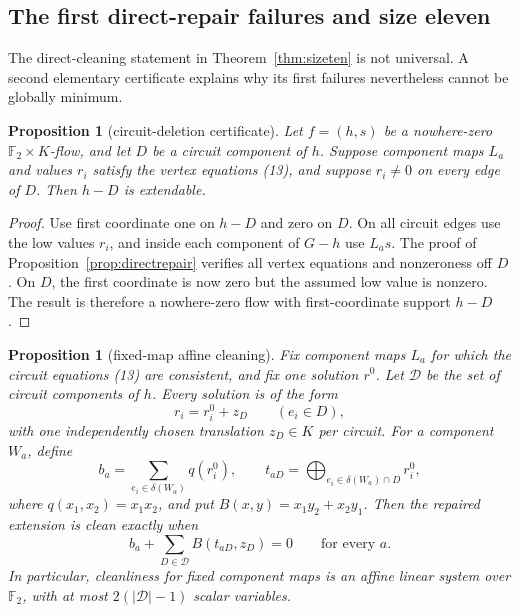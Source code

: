 \documentclass[11pt]{article}
\newtheorem{proposition}[theorem]{Proposition}
\theoremstyle{definition}
\theoremstyle{remark}
\newcommand{\F}{\mathbb F}
\begin{document}
\subsection{The first direct-repair failures and size eleven}

The direct-cleaning statement in Theorem~\ref{thm:sizeten} is not
universal.  A second elementary certificate explains why its first
failures nevertheless cannot be globally minimum.

\begin{proposition}[circuit-deletion certificate]
\label{prop:deletecircuit}
Let \(f=(h,s)\) be a nowhere-zero \(\F_2\times K\)-flow, and let \(D\) be
a circuit component of \(h\).  Suppose component maps \(L_a\) and values
\(r_i\) satisfy the vertex equations (13), and suppose \(r_i\ne0\) on
every edge of \(D\).  Then \(h-D\) is extendable.
\end{proposition}

\begin{proof}
Use first coordinate one on \(h-D\) and zero on \(D\).  On all circuit
edges use the low values \(r_i\), and inside each component of \(G-h\)
use \(L_as\).  The proof of Proposition~\ref{prop:directrepair} verifies
all vertex equations and nonzeroness off \(D\).  On \(D\), the first
coordinate is now zero but the assumed low value is nonzero.  The result
is therefore a nowhere-zero flow with first-coordinate support \(h-D\).
\end{proof}

\begin{proposition}[fixed-map affine cleaning]\label{prop:affineclean}
Fix component maps \(L_a\) for which the circuit equations (13) are
consistent, and fix one solution \(r^0\).  Let \(\mathcal D\) be the set
of circuit components of \(h\).  Every solution is of the form
\[
                       r_i=r_i^0+z_D\qquad(e_i\in D),
\]
with one independently chosen translation \(z_D\in K\) per circuit.
For a component \(W_a\), define
\[
 b_a=\sum_{e_i\in\delta(W_a)}q(r_i^0),\qquad
 t_{aD}=\bigoplus_{e_i\in\delta(W_a)\cap D}r_i^0,
\]
where \(q(x_1,x_2)=x_1x_2\), and put
\(B(x,y)=x_1y_2+x_2y_1\).  Then the repaired extension is clean exactly
when
\[
                         b_a+\sum_{D\in\mathcal D}B(t_{aD},z_D)=0
                         \qquad\text{for every }a.        \tag{15a}
\]
In particular, cleanliness for fixed component maps is an affine linear
system over \(\F_2\), with at most \(2(|\mathcal D|-1)\) scalar variables.
\end{proposition}
\end{document}
